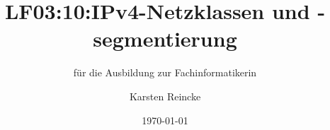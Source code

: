 \documentclass[]{beamer}
\title{LF03:10:IPv4-Netzklassen und -segmentierung}
\subtitle{für die Ausbildung zur Fachinformatikerin}
\institute{GS-LDK}
\author{Karsten Reincke}
\date{\today}
\def\cfgGl{../../../cfg.gl/}
\begin{document}

\begin{frame}
  \titlepage
\end{frame}






\logo{}
\newpage



%
\end{document}
